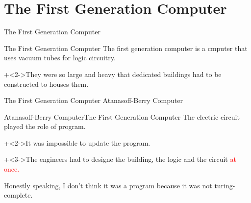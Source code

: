 %
%

\section{The First Generation Computer}


\begin{frame}{}{}
    {\Large The First Generation Computer}
\end{frame}


\begin{frame}{The First Generation Computer}{}
    The first generation computer is a cmputer that uses vacuum tubes for logic circuitry.
    \vspace{4ex}

    \onslide+<2->{They were so large and heavy that dedicated buildings had to be constructed to houses them.}
\end{frame}


\begin{frame}{The First Generation Computer}{}
    {\huge Atanasoff-Berry Computer}
\end{frame}


\begin{frame}{Atanasoff-Berry Computer}{The First Generation Computer}
    The electric circuit played the role of program.
    \vspace{4ex}

    \onslide+<2->{It was impossible to update the program.}
    \vspace{4ex}

    \onslide+<3->{The engineers had to designe the building, the logic and the circuit \textcolor{red}{at once.}}
    \vspace{4ex}

    {\footnotesize Honestly speaking, I don't think it was a program because it was not turing-complete.}
\end{frame}


